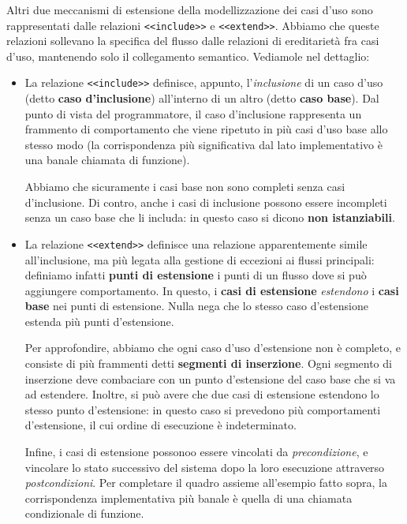 \documentclass[a4paper,11pt]{article}
\begin{document}
Altri due meccanismi di estensione della modellizzazione dei casi d'uso sono rappresentati dalle relazioni \lstinline|<<include>>| e \lstinline|<<extend>>|. Abbiamo che queste relazioni sollevano la specifica del flusso dalle relazioni di ereditarietà fra casi d'uso, mantenendo solo il collegamento semantico. Vediamole nel dettaglio:
\begin{itemize}
	\item La relazione \lstinline|<<include>>| definisce, appunto, l'\textit{inclusione} di un caso d'uso (detto \textbf{caso d'inclusione}) all'interno di un altro (detto \textbf{caso base}). Dal punto di vista del programmatore, il caso d'inclusione rappresenta un frammento di comportamento che viene ripetuto in più casi d'uso base allo stesso modo (la corrispondenza più significativa dal lato implementativo è una banale chiamata di funzione).

		Abbiamo che sicuramente i casi base non sono completi senza casi d'inclusione. Di contro, anche i casi di inclusione possono essere incompleti senza un caso base che li includa: in questo caso si dicono \textbf{non istanziabili}.

	\item La relazione \lstinline|<<extend>>| definisce una relazione apparentemente simile all'inclusione, ma più legata alla gestione di eccezioni ai flussi principali: definiamo infatti \textbf{punti di estensione} i punti di un flusso dove si può aggiungere comportamento. In questo, i \textbf{casi di estensione} \textit{estendono} i \textbf{casi base} nei punti di estensione. Nulla nega che lo stesso caso d'estensione estenda più punti d'estensione.

		Per approfondire, abbiamo che ogni caso d'uso d'estensione non è completo, e consiste di più frammenti detti \textbf{segmenti di inserzione}. Ogni segmento di inserzione deve combaciare con un punto d'estensione del caso base che si va ad estendere. Inoltre, si può avere che due casi di estensione estendono lo stesso punto d'estensione: in questo caso si prevedono più comportamenti d'estensione, il cui ordine di esecuzione è indeterminato.

		Infine, i casi di estensione possonoo essere vincolati da \textit{precondizione}, e vincolare lo stato successivo del sistema dopo la loro esecuzione attraverso \textit{postcondizioni}. Per completare il quadro assieme all'esempio fatto sopra, la corrispondenza implementativa più banale è quella di una chiamata condizionale di funzione.
\end{itemize}
\end{document}

